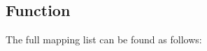 \documentclass[letterpaper,12pt,english]{sphinxmanual}
\begin{document}
\subsection{ Function}
\label{\detokenize{s3:s3-content-type-function}}
\begin{sphinxVerbatim}[commandchars=\\\{\}]
 
      

     \PYG{p}{[}\PYG{p}{]}
\end{sphinxVerbatim}

\sphinxAtStartPar
The full mapping list can be found as follows:
\end{document}

